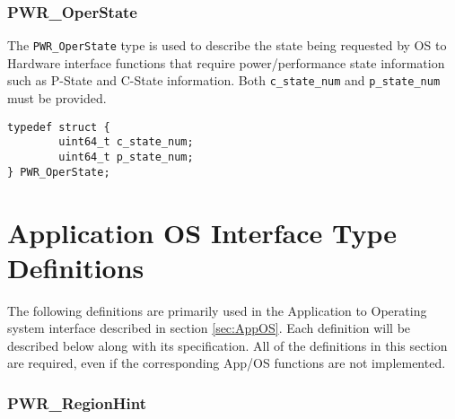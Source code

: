
\subsubsection{PWR_OperState}\label{type:OperState}

The \texttt{PWR_OperState} type is used to describe the state being requested by OS to Hardware interface functions that require power/performance state information such as P-State and C-State information. 
Both \texttt{c_state_num} and \texttt{p_state_num} must be provided.

\begin{center}
\begin{minipage}{.95\linewidth}%
\begin{lstlisting}
typedef struct {
        uint64_t c_state_num;
        uint64_t p_state_num;
} PWR_OperState;
\end{lstlisting}
\end{minipage}
\end{center}




\section{Application OS Interface Type Definitions}\label{sec:AppOSTypeDefinitions}
The following definitions are primarily used in the Application to Operating system interface described in section \ref{sec:AppOS}.
Each definition will be described below along with its specification. All of the definitions in this section are required, even if the corresponding App/OS functions are not implemented.

\subsubsection{PWR_RegionHint}\label{type:RegionHint}

